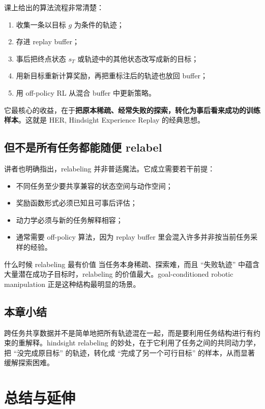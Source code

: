 \documentclass[a4paper]{article}
\begin{document}
课上给出的算法流程非常清楚：

\begin{enumerate}
\item 收集一条以目标 $g$ 为条件的轨迹；
\item 存进 replay buffer；
\item 事后把终点状态 $s_T$ 或轨迹中的其他状态改写成新的目标；
\item 用新目标重新计算奖励，再把重标注后的轨迹也放回 buffer；
\item 用 off-policy RL 从混合 buffer 中更新策略。
\end{enumerate}

它最核心的收益，在于\textbf{把原本稀疏、经常失败的探索，转化为事后看来成功的训练样本}。这就是 HER, Hindsight Experience Replay 的经典思想。

\subsection{但不是所有任务都能随便 relabel}

讲者也明确指出，relabeling 并非普适魔法。它成立需要若干前提：

\begin{itemize}
\item 不同任务至少要共享兼容的状态空间与动作空间；
\item 奖励函数形式必须已知且可事后评估；
\item 动力学必须与新的任务解释相容；
\item 通常需要 off-policy 算法，因为 replay buffer 里会混入许多并非按当前任务采样的经验。
\end{itemize}

\begin{importantbox}{什么时候 relabeling 最有价值}
当任务本身稀疏、探索难，而且 ``失败轨迹'' 中蕴含大量潜在成功子目标时，relabeling 的价值最大。goal-conditioned robotic manipulation 正是这种结构最明显的场景。
\end{importantbox}

\subsection{本章小结}

跨任务共享数据并不是简单地把所有轨迹混在一起，而是要利用任务结构进行有约束的重解释。hindsight relabeling 的妙处，在于它利用了任务之间的共同动力学，把 ``没完成原目标'' 的轨迹，转化成 ``完成了另一个可行目标'' 的样本，从而显著缓解探索困难。

\section{总结与延伸}
\end{document}
